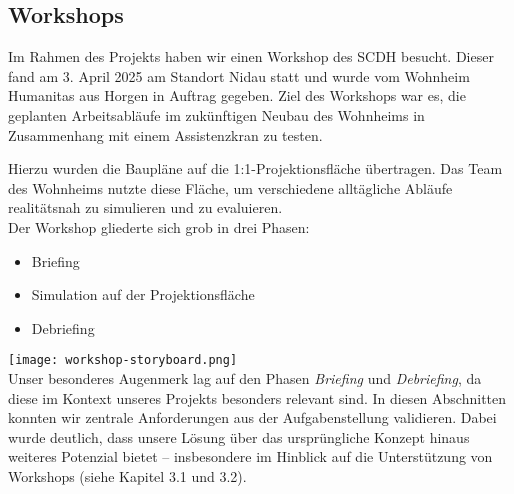 \subsection{Workshops}
Im Rahmen des Projekts haben wir einen Workshop des SCDH besucht. Dieser fand am 3. April 2025 am Standort Nidau statt und wurde vom Wohnheim Humanitas aus Horgen in Auftrag gegeben. Ziel des Workshops war es, die geplanten Arbeitsabläufe im zukünftigen Neubau des Wohnheims in Zusammenhang mit einem Assistenzkran zu testen.

Hierzu wurden die Baupläne auf die 1:1-Projektionsfläche übertragen. Das Team des Wohnheims nutzte diese Fläche, um verschiedene alltägliche Abläufe realitätsnah zu simulieren und zu evaluieren.\\

Der Workshop gliederte sich grob in drei Phasen:
\begin{itemize}
  \item Briefing
  \item Simulation auf der Projektionsfläche
  \item Debriefing
\end{itemize}

\texttt{[image: workshop-storyboard.png]}\\

Unser besonderes Augenmerk lag auf den Phasen \textit{Briefing} und \textit{Debriefing}, da diese im Kontext unseres Projekts besonders relevant sind. In diesen Abschnitten konnten wir zentrale Anforderungen aus der Aufgabenstellung validieren. Dabei wurde deutlich, dass unsere Lösung über das ursprüngliche Konzept hinaus weiteres Potenzial bietet – insbesondere im Hinblick auf die Unterstützung von Workshops (siehe Kapitel 3.1 und 3.2).

